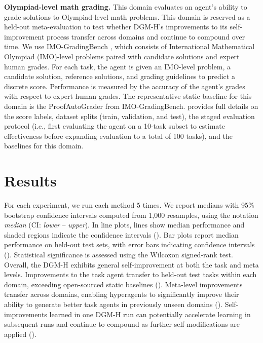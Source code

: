 \documentclass[]{fairmeta}
\providecommand{\DIFaddtex}[1]{{\protect\color{blue}\uwave{#1}}} %
\providecommand{\DIFaddbegin}{} %
\providecommand{\DIFaddend}{} %
\providecommand{\DIFadd}[1]{\texorpdfstring{\DIFaddtex{#1}}{#1}} %
\begin{document}
\textbf{Olympiad-level math grading.}
This domain evaluates an agent's ability to grade solutions to Olympiad-level math problems. This domain is reserved as a held-out meta-evaluation to test whether DGM-H's improvements to its self-improvement process transfer across domains and continue to compound over time. We use IMO-GradingBench \citep{luong2025towards}, which consists of International Mathematical Olympiad (IMO)-level problems paired with candidate solutions and expert human grades. For each task, the agent is given an IMO-level problem, a candidate solution, reference solutions, and grading guidelines to predict a discrete score. Performance is measured by the accuracy of the agent's grades with respect to expert human grades. The representative static baseline for this domain is the ProofAutoGrader from IMO-GradingBench.  provides full details on the score labels, dataset splits (train, validation, and test), the staged evaluation protocol (i.e., first evaluating the agent on a 10-task subset to estimate effectiveness before expanding evaluation to a total of 100 tasks), and the baselines for this domain.

\section{Results}
\label{sec:results}

For each experiment, we run each method 5 times. We report medians with 95\% bootstrap confidence intervals computed from 1,000 resamples, using the notation \textit{median} (CI: \textit{lower} -- \textit{upper}). In line plots, lines show median performance and shaded regions indicate the confidence intervals (). Bar plots report median performance on held-out test sets, with error bars indicating confidence intervals (). Statistical significance is assessed using the Wilcoxon signed-rank test. Overall, the DGM-H exhibits general self-improvement at both the task and meta levels. Improvements to the task agent transfer to held-out test tasks within each domain, exceeding open-sourced static baselines (). Meta-level improvements transfer across domains, enabling hyperagents to significantly improve their ability to generate better task agents in previously unseen domains (). Self-improvements learned in one DGM-H run can potentially accelerate learning in subsequent runs and continue to compound as further self-modifications are applied (). \DIFaddbegin \DIFadd{All experiment logs are open-sourced in our codebase.
}\DIFaddend 
\end{document}
